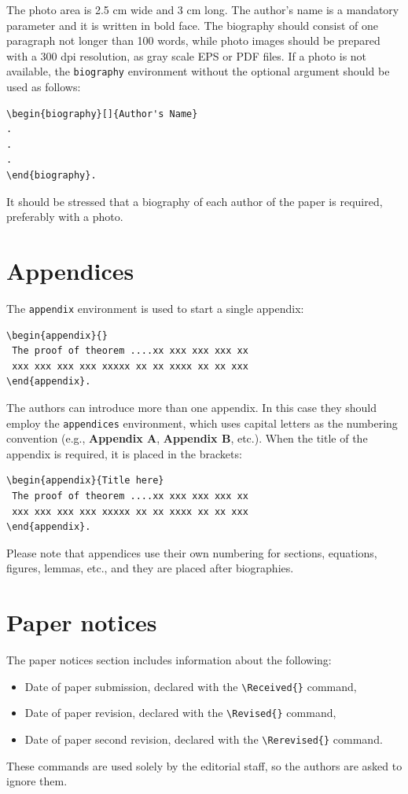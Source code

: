 \documentclass{amcs}
\begin{document}
The photo area is 2.5 cm wide and 3 cm long. The author's name is a mandatory parameter and it is written in bold face. The biography should consist of one paragraph not longer than 100 words, while photo images should be prepared with a 300 dpi resolution, as gray scale EPS or PDF files. If a photo is not available, the \verb+biography+ environment without the optional argument should be used as follows:
{\small\begin{verbatim}
\begin{biography}[]{Author's Name}
.
.
.
\end{biography}.
\end{verbatim}}

It should be stressed that a biography of each author of the paper is required, preferably with a photo.

\section{Appendices}

The \verb+appendix+ environment is used to start a single appendix:
{\small \begin{verbatim}
\begin{appendix}{}
 The proof of theorem ....xx xxx xxx xxx xx
 xxx xxx xxx xxx xxxxx xx xx xxxx xx xx xxx
\end{appendix}.
\end{verbatim}}
The authors can introduce more than one appendix. In this case they should employ the \verb+appendices+ environment, which uses capital letters as the numbering convention (e.g., \textbf{Appendix A}, \textbf{Appendix B}, etc.). When the title of the appendix is required, it is placed in the brackets:
{\small \begin{verbatim}
\begin{appendix}{Title here}
 The proof of theorem ....xx xxx xxx xxx xx
 xxx xxx xxx xxx xxxxx xx xx xxxx xx xx xxx
\end{appendix}.
\end{verbatim}}

Please note that appendices use their own numbering for sections, equations, figures, lemmas, etc., and they are placed after biographies.

\section{Paper notices}
The paper notices section includes information about the following:
\begin{itemize}
  \item
    Date of paper submission, declared with the \verb+\Received{}+ command,
  \item
    Date of paper revision, declared with the \verb+\Revised{}+ command,
  \item
    Date of paper second revision, declared with the \verb+\Rerevised{}+ command.
\end{itemize}
These commands are used solely by the editorial staff, so the authors are asked to ignore them.
\end{document}
